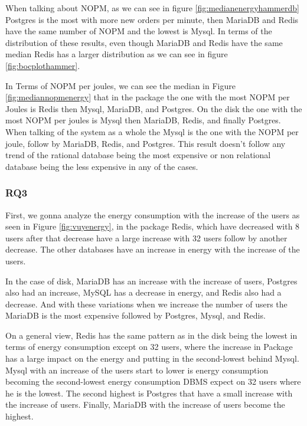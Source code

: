 	When talking about NOPM, as we can see in figure \ref{fig:medianenergyhammerdb} Postgres is the most with more new orders per minute, then MariaDB and Redis have the same number of NOPM and the lowest is Mysql. In terms of the distribution of these results, even though MariaDB and Redis have the same median Redis has a larger distribution as we can see in figure \ref{fig:bocplothammer}.
	
	In Terms of NOPM per joules, we can see the median in Figure \ref{fig:mediannopmenergy} that in the package the one with the most NOPM per Joules is Redis then Mysql, MariaDB, and Postgres. On the disk the one with the most NOPM per joules is Mysql then MariaDB, Redis, and finally Postgres. When talking of the system as a whole the Mysql is the one with the NOPM per joule, follow by MariaDB, Redis, and Postgres. This result doesn't follow any trend of the rational database being the most expensive or non relational database being the less expensive in any of the cases.

    \subsubsection{RQ3}
    
    First, we gonna analyze the energy consumption with the increase of the users as seen in Figure \ref{fig:vuyenergy}, in the package Redis, which have decreased with 8 users after that decrease have a large increase with 32 users follow by another decrease. The other databases have an increase in energy with the increase of the users.
    
    In the case of disk, MariaDB has an increase with the increase of users, Postgres also had an increase, MySQL has a decrease in energy, and Redis also had a decrease. And with these variations when we increase the number of users the MariaDB is the most expensive followed by Postgres, Mysql, and Redis.
    
    On a general view, Redis has the same pattern as in the disk being the lowest in terms of energy consumption except on 32 users, where the increase in Package has a large impact on the energy and putting in the second-lowest behind Mysql. Mysql with an increase of the users start to lower is energy consumption becoming the second-lowest energy consumption DBMS expect on 32 users where he is the lowest. The second highest is Postgres that have a small increase with the increase of users. Finally, MariaDB with the increase of users become the highest.   
    
